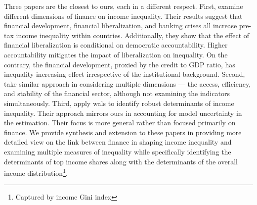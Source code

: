 \documentclass[a4paper,11pt]{article}
\begin{document}
Three papers are the closest to ours, each in a different respect. First, \citet{de2017finance} examine different dimensions of finance on income inequality. Their results suggest that financial development, financial liberalization, and banking crises all increase pre-tax income inequality within countries. Additionally, they show that the effect of financial liberalization is conditional on democratic accountability. Higher accountability mitigates the impact of liberalization on inequality. On the contrary, the financial development, proxied by the credit to GDP ratio, has inequality increasing effect irrespective of the institutional background. Second, \citet{naceurzhang2016} take similar approach in considering multiple dimensions --- the access, efficiency, and stability of the financial sector, although not examining the indicators simultaneously.  Third, \citet{furceri2019robust} apply \ac{wals} to identify robust determinants of income inequality. Their approach mirrors ours in accounting for model uncertainty in the estimation. Their focus is more general rather than focused primarily on finance. We provide synthesis and extension to these papers in providing more detailed view on the link between finance in shaping income inequality and examining multiple measures of inequality while specifically identifying the determinants of top income shares along with the determinants of the overall income distribution\footnote{Captured by income Gini index}.


\end{document}
